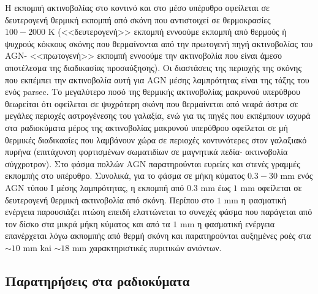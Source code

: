 Η εκπομπή ακτινοβολίας στο κοντινό και στο μέσο υπέρυθρο οφείλεται σε δευτερογενή θερμική εκπομπή από σκόνη που αντιστοιχεί σε θερμοκρασίες $100-2000$ K (<<δευτερογενή>> εκπομπή εννοούμε εκπομπή από θερμούς ή ψυχρούς κόκκους σκόνης που θερμαίνονται από την πρωτογενή πηγή ακτινοβολίας του \textlatin{AGN}- <<πρωτογενή>> εκπομπή εννοούμε την ακτινοβολία που είναι άμεσο αποτέλεσμα της διαδικασίας προσαύξησης). Οι διαστάσεις της περιοχής της σκόνης που εκπέμπει την ακτινοβολία αυτή για \textlatin{AGN} μέσης λαμπρότητας είναι της τάξης του ενός \textlatin{parsec}. Το μεγαλύτερο ποσό της θερμικής ακτινοβολίας μακρυνού υπερύθρου θεωρείται ότι οφείλεται σε ψυχρότερη σκόνη που θερμαίνεται από νεαρά άστρα σε μεγάλες περιοχές αστρογένεσης του γαλαξία, ενώ για τις πηγές που εκπέμπουν ισχυρά στα ραδιοκύματα μέρος της ακτινοβολίας μακρυνού υπερύθρου οφείλεται σε μή θερμικές διαδικασίες που λαμβάνουν χώρα σε περιοχές κοντυνότερες στον γαλαξιακό πυρήνα (επιτάχυνση φορτισμένων σωματιδίων σε μαγνητικά πεδία- ακτινοβολία σύγχροτρον). Στο φάσμα πολλών \textlatin{AGN} παρατηρούνται ευρείες και στενές γραμμές εκπομπής στο υπέρυθρο. Συνολικά, για το φάσμα σε μήκη κύματος $0.3 -30$ m\textlatin{m} ενός \textlatin{AGN} τύπου Ι μέσης λαμπρότητας, η εκπομπή από $0.3$ m\textlatin{m} έως $1 $ m\textlatin{m}  οφείλεται σε δευτερογενή θερμική ακτινοβολία από σκόνη. Περίπου στο $1$ m\textlatin{m} η φασματική ενέργεια παρουσιάζει πτώση επειδή ελαττώνεται το συνεχές φάσμα που παράγεται από τον δίσκο στα μικρά μήκη κύματος και από τα $1$ m\textlatin{m} η φασματική ενέργεια επανέρχεται λόγω ακπομπής από θερμή σκόνη και παρατηρούνται αυξημένες ροές στα $\sim 10 $ m\textlatin{m} kai $\sim 18$ m\textlatin{m} χαρακτηριστικές πυριτικών ανιόντων\cite{netzer_2013}.

\subsection*{Παρατηρήσεις στα ραδιοκύματα}

